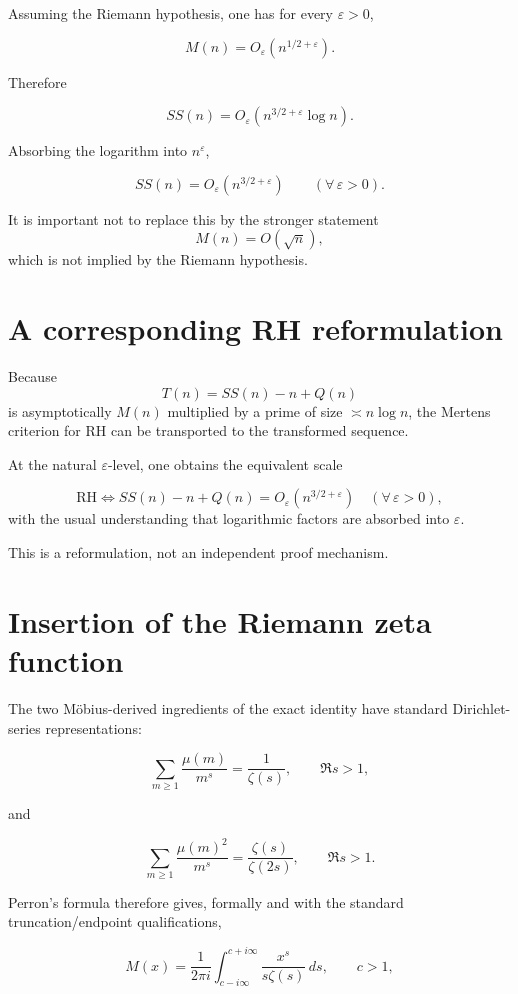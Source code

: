 \documentclass[11pt]{amsart}
\newcommand{\mob}{\mu}
\newcommand{\Mert}{M}
\newcommand{\Sq}{Q}
\begin{document}
Assuming the Riemann hypothesis, one has for every $\varepsilon>0$,

\[
\Mert(n)=O_\varepsilon\!\left(n^{1/2+\varepsilon}\right).
\]

Therefore

\[
SS(n)
=
O_\varepsilon\!\left(n^{3/2+\varepsilon}\log n\right).
\]

Absorbing the logarithm into $n^\varepsilon$,

\[
\boxed{
SS(n)
=
O_\varepsilon\!\left(n^{3/2+\varepsilon}\right)
\qquad
(\forall\,\varepsilon>0).
}
\]

It is important not to replace this by the stronger statement
\[
\Mert(n)=O(\sqrt n),
\]
which is not implied by the Riemann hypothesis.

\section{A corresponding RH reformulation}

Because
\[
T(n)=SS(n)-n+\Sq(n)
\]
is asymptotically $\Mert(n)$ multiplied by a prime of size $\asymp n\log n$, the Mertens criterion for RH can be transported to the transformed sequence.

At the natural $\varepsilon$-level, one obtains the equivalent scale

\[
\boxed{
\mathrm{RH}
\Longleftrightarrow
SS(n)-n+\Sq(n)
=
O_\varepsilon\!\left(n^{3/2+\varepsilon}\right)
\quad
(\forall\,\varepsilon>0),
}
\]
with the usual understanding that logarithmic factors are absorbed into $\varepsilon$.

This is a reformulation, not an independent proof mechanism.

\section{Insertion of the Riemann zeta function}

The two M\"obius-derived ingredients of the exact identity have standard Dirichlet-series representations:

\[
\sum_{m\ge1}\frac{\mob(m)}{m^s}
=
\frac1{\zeta(s)},
\qquad
\Re s>1,
\]

and

\[
\sum_{m\ge1}\frac{\mob(m)^2}{m^s}
=
\frac{\zeta(s)}{\zeta(2s)},
\qquad
\Re s>1.
\]

Perron's formula therefore gives, formally and with the standard truncation/endpoint qualifications,

\[
\Mert(x)
=
\frac{1}{2\pi i}
\int_{c-i\infty}^{c+i\infty}
\frac{x^s}{s\zeta(s)}\,ds,
\qquad
c>1,
\]
\end{document}

